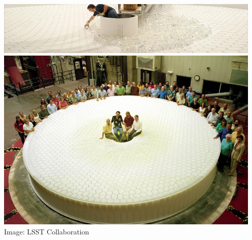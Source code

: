 \documentclass{beamer}
\begin{document}
{\begin{columns}
\begin{column}{0.5\textwidth}
\begin{itemize}
            \end{itemize}
        \end{column}
        \begin{column}{0.5\textwidth}    
            \includegraphics[width=\textwidth]{mirror-casting-banner.jpg}
            \newline
            \vspace{2mm}
            \includegraphics[width=\textwidth]{Group_photo-half-scaled.jpg}
            \newline
            \hfill {\tiny Image: LSST Collaboration}
        \end{column}
    \end{columns}
}
\end{document}
